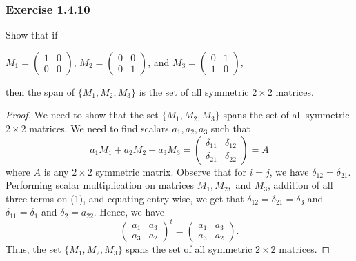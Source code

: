 \subsubsection{Exercise 1.4.10} Show that if 
\begin{center}
    \( M_{1} = \begin{pmatrix}
        1 & 0 \\
        0 & 0 
    \end{pmatrix} \), \( M_{2} =  \begin{pmatrix}
        0 & 0 \\ 
        0 & 1 
    \end{pmatrix} \), and 
    \( M_{3} = \begin{pmatrix}
        0 & 1 \\
        1 & 0 
    \end{pmatrix} \),
\end{center} then the span of \( \{ M_{1} , M_{2} , M_{3} \}  \) is the set of all symmetric \( 2 \times 2  \) matrices.

\begin{proof}
We need to show that the set \( \{  M_{1}, M_{2}, M_{3} \} \) spans the set of all symmetric \(  2 \times 2  \) matrices. We need to find scalars \( a_{1} , a_{2} , a_{3}  \) such that 
\[  a_{1} M_{1} + a_{2} M_{2} + a_{3} M_{3} = \begin{pmatrix}
    \delta_{11} & \delta_{12} \\
    \delta_{21} & \delta_{22}
\end{pmatrix} = A  \tag{1}  \]
where \( A  \) is any \( 2 \times 2  \) symmetric  matrix.  Observe that for \( i = j  \), we have \( \delta_{12} = \delta_{21} \). Performing scalar multiplication on matrices \( M_{1}, M_{2},  \) and \( M_{3} \), addition of all three terms on (1), and equating entry-wise, we get that \( \delta_{12} = \delta_{21} = \delta_{3} \) and \( \delta_{11} = \delta_{1}  \) and \( \delta_{2} = a_{22} \). Hence, we have
\[  
 \begin{pmatrix}
    a_{1} & a_{3} \\
    a_{3} & a_{2} 
\end{pmatrix}^{t} =  \begin{pmatrix}
    a_{1} & a_{3} \\
    a_{3} & a_{2} 
\end{pmatrix}.    \]
Thus, the set \( \{ M_{1}, M_{2}, M_{3}  \}   \) spans the set of all symmetric \( 2 \times 2  \) matrices.
\end{proof} 

